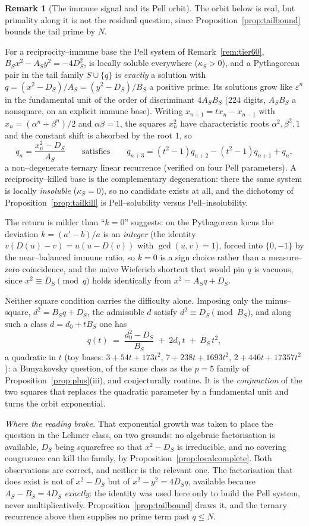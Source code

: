 \documentclass[11pt]{article}
\theoremstyle{definition}
\newtheorem{remark}[theorem]{Remark}
\begin{document}
\begin{remark}[The immune signal and its Pell orbit]\label{rem:lehmer}
The orbit below is real, but primality along it is not the residual question, since
Proposition~\ref{prop:tailbound} bounds the tail prime by $N$.

For a reciprocity--immune base the Pell system of Remark~\ref{rem:tier60},
$B_Sx^2-A_Sy^2=-4D_S^2$, is locally soluble everywhere ($\kappa_S>0$), and a Pythagorean pair in the
tail family $S\cup\{q\}$ is \emph{exactly} a solution with $q=(x^2-D_S)/A_S=(y^2-D_S)/B_S$ a
positive prime. Its solutions grow like $\varepsilon^n$ in the fundamental unit of the order of
discriminant $4A_SB_S$ ($224$ digits, $A_SB_S$ a nonsquare, on an explicit immune base). Writing
$x_{n+1}=tx_n-x_{n-1}$ with $x_n=(\alpha^n+\beta^n)/2$ and $\alpha\beta=1$, the squares $x_n^2$ have
characteristic roots $\alpha^2,\beta^2,1$ and the constant shift is absorbed by the root $1$, so
\[ q_n=\frac{x_n^2-D_S}{A_S}\qquad\text{satisfies}\qquad q_{n+3}=(t^2-1)q_{n+2}-(t^2-1)q_{n+1}+q_n, \]
a non--degenerate ternary linear recurrence (verified on four Pell parameters). A
reciprocity--killed base is the complementary degeneration: there the same system is locally
\emph{insoluble} ($\kappa_S=0$), so no candidate exists at all, and the dichotomy of
Proposition~\ref{prop:tailkill} is Pell--solubility versus Pell--insolubility.

The return is milder than ``$k=0$'' suggests: on the Pythagorean locus the deviation $k=(a'-b)/a$ is
an \emph{integer} (the identity $v(D(u)-v)=u(u-D(v))$ with $\gcd(u,v)=1$), forced into $\{0,-1\}$ by
the near--balanced immune ratio, so $k=0$ is a sign choice rather than a measure--zero coincidence,
and the naive Wieferich shortcut that would pin $q$ is vacuous, since $x^2\equiv D_S\pmod q$ holds
identically from $x^2=A_Sq+D_S$.

Neither square condition carries the difficulty alone. Imposing only the minus--square,
$d^2=B_Sq+D_S$, the admissible $d$ satisfy $d^2\equiv D_S\pmod{B_S}$, and along such a class
$d=d_0+tB_S$ one has
\[ q(t)\;=\;\frac{d_0^2-D_S}{B_S}\;+\;2d_0\,t\;+\;B_S\,t^2, \]
a quadratic in $t$ (toy bases: $3+54t+173t^2$, $7+238t+1693t^2$, $2+446t+17357t^2$): a Bunyakovsky
question, of the same class as the $p=5$ family of Proposition~\ref{prop:plus}\textup{(iii)}, and
conjecturally routine. It is the \emph{conjunction} of the two squares that replaces the quadratic
parameter by a fundamental unit and turns the orbit exponential.

\emph{Where the reading broke.} That exponential growth was taken to place the question in the
Lehmer class, on two grounds: no algebraic factorisation is available, $D_S$ being squarefree so
that $x^2-D_S$ is irreducible, and no covering congruence can kill the family, by
Proposition~\ref{prop:localcomplete}. Both observations are correct, and neither is the relevant
one. The factorisation that does exist is not of $x^2-D_S$ but of $x^2-y^2=4D_Sq$, available because
$A_S-B_S=4D_S$ \emph{exactly}: the identity was used here only to build the Pell system, never
multiplicatively. Proposition~\ref{prop:tailbound} draws it, and the ternary recurrence above then
supplies no prime term past $q\le N$.


\end{remark}
\end{document}

